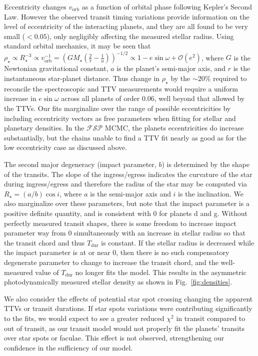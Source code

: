 \documentclass[oneside]{emulateapj}
\begin{document}
Eccentricity changes $v_\mathrm{orb}$ as a function of orbital phase following Kepler's Second Law. However the observed transit timing variations provide information on the level of eccentricity of the interacting planets, and they are all found to be very small ($<0.05$), only negligibly affecting the measured stellar radius. %
Using standard orbital mechanics, it may be seen that $\rho_\star \propto R_\star^{-3} \propto v_\mathrm{orb}^{-1} = (G M_\star (\frac{2}{r} - \frac{1}{a}))^{-1/2} \propto 1 - e \sin \omega + \mathcal{O}(e^2)$, where $G$ is the Newtonian gravitational constant, $a$ is the planet's semi-major axis, and $r$ is the instantaneous star-planet distance. Thus change in $\rho_\star$ by the $\sim$20\% required to reconcile the spectroscopic and TTV measurements would require a uniform increase in $e \sin \omega$ across all planets of order 0.06, well beyond that allowed by the TTVs.  
Our fits marginalize over the range of possible eccentricities by including eccentricity vectors as free parameters when fitting for stellar and planetary densities. In the $\mathcal{FSP}$ MCMC, the planets eccentricities do increase substantially, but the chains unable to find a TTV fit nearly as good as for the low eccentricity case as discussed above. 

The second major degeneracy (impact parameter, $b$) is determined by the shape of the transits. The slope of the ingress/egress indicates the curvature of the star during ingress/egress and therefore the radius of the star may be computed via $R_\star = (a/b) \cos i$, where $a$ is the semi-major axis and $i$ is the inclination. We also marginalize over these parameters, but note that the impact parameter is a positive definite quantity, and is consistent with 0 for planets d and g. Without perfectly measured transit shapes, there is some freedom to increase impact parameter way from 0 simultaneously with an increase in stellar radius so that the transit chord and thus $T_\mathrm{dur}$ is constant. If the stellar radius is decreased while the impact parameter is at or near 0, then there is no such compensatory degenerate parameter to change to increase the transit chord, and the well-measured value of $T_\mathrm{dur}$ no longer fits the model. This results in the asymmetric photodynamically measured stellar density as shown in Fig.~\ref{fig:densities}. 

We also consider the effects of potential star spot crossing changing the apparent TTVs or transit durations. If star spots variations were contributing significantly to the fits, we would expect to see a greater reduced $\chi^2$ in transit compared to out of transit, as our transit model would not properly fit the planets' transits over star spots or faculae. This effect is not observed, strengthening our confidence in the sufficiency of our model. 
\end{document}
